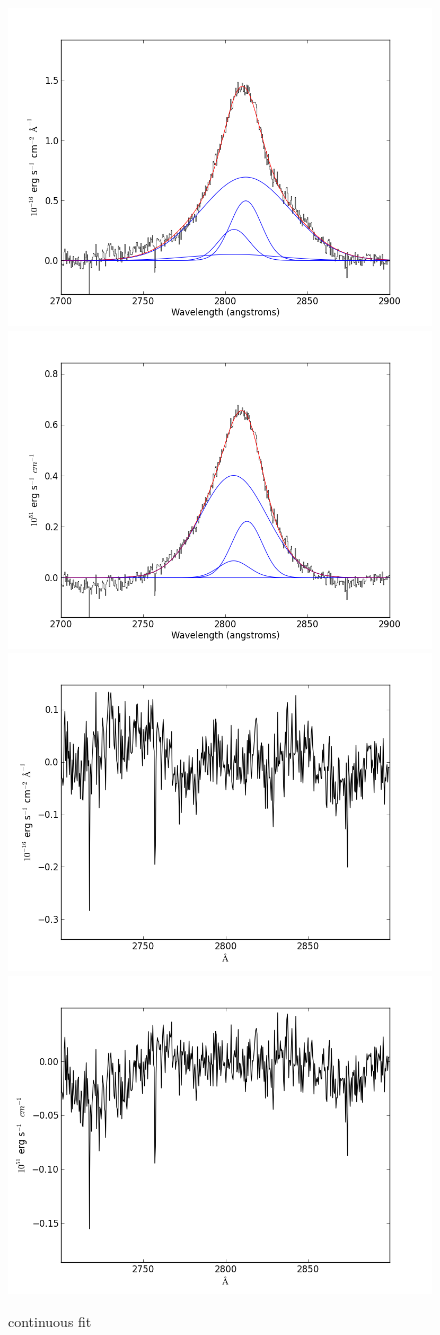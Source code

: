 \documentclass[usenatbib]{mn2e}
\begin{document}
\begin{figure}
\begin{center}
\includegraphics[width=0.46\linewidth,angle=0]{MgII_0.png}
\vspace{5mm}
\includegraphics[width=0.49\linewidth,angle=0]{MgII_1.png}\\
\includegraphics[width=0.46\linewidth,angle=0]{MgII_res_0.png}
\hspace{5mm}
\includegraphics[width=0.49\linewidth,angle=0]{MgII_res_1.png}\\
\end{center} 
\caption{continuous fit \label{fig:landscape}}   
\end{figure}
\end{document}

